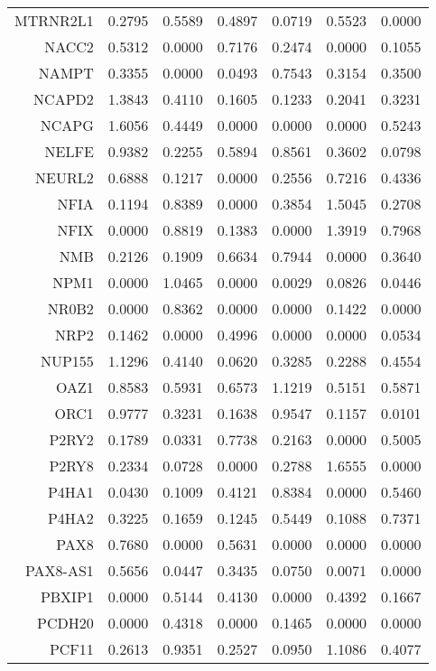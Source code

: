 \begin{longtable}{rrrrrrr}
  MTRNR2L1 & 0.2795 & 0.5589 & 0.4897 & 0.0719 & 0.5523 & 0.0000 \\ 
  NACC2 & 0.5312 & 0.0000 & 0.7176 & 0.2474 & 0.0000 & 0.1055 \\ 
  NAMPT & 0.3355 & 0.0000 & 0.0493 & 0.7543 & 0.3154 & 0.3500 \\ 
  NCAPD2 & 1.3843 & 0.4110 & 0.1605 & 0.1233 & 0.2041 & 0.3231 \\ 
  NCAPG & 1.6056 & 0.4449 & 0.0000 & 0.0000 & 0.0000 & 0.5243 \\ 
  NELFE & 0.9382 & 0.2255 & 0.5894 & 0.8561 & 0.3602 & 0.0798 \\ 
  NEURL2 & 0.6888 & 0.1217 & 0.0000 & 0.2556 & 0.7216 & 0.4336 \\ 
  NFIA & 0.1194 & 0.8389 & 0.0000 & 0.3854 & 1.5045 & 0.2708 \\ 
  NFIX & 0.0000 & 0.8819 & 0.1383 & 0.0000 & 1.3919 & 0.7968 \\ 
  NMB & 0.2126 & 0.1909 & 0.6634 & 0.7944 & 0.0000 & 0.3640 \\ 
  NPM1 & 0.0000 & 1.0465 & 0.0000 & 0.0029 & 0.0826 & 0.0446 \\ 
  NR0B2 & 0.0000 & 0.8362 & 0.0000 & 0.0000 & 0.1422 & 0.0000 \\ 
  NRP2 & 0.1462 & 0.0000 & 0.4996 & 0.0000 & 0.0000 & 0.0534 \\ 
  NUP155 & 1.1296 & 0.4140 & 0.0620 & 0.3285 & 0.2288 & 0.4554 \\ 
  OAZ1 & 0.8583 & 0.5931 & 0.6573 & 1.1219 & 0.5151 & 0.5871 \\ 
  ORC1 & 0.9777 & 0.3231 & 0.1638 & 0.9547 & 0.1157 & 0.0101 \\ 
  P2RY2 & 0.1789 & 0.0331 & 0.7738 & 0.2163 & 0.0000 & 0.5005 \\ 
  P2RY8 & 0.2334 & 0.0728 & 0.0000 & 0.2788 & 1.6555 & 0.0000 \\ 
  P4HA1 & 0.0430 & 0.1009 & 0.4121 & 0.8384 & 0.0000 & 0.5460 \\ 
  P4HA2 & 0.3225 & 0.1659 & 0.1245 & 0.5449 & 0.1088 & 0.7371 \\ 
  PAX8 & 0.7680 & 0.0000 & 0.5631 & 0.0000 & 0.0000 & 0.0000 \\ 
  PAX8-AS1 & 0.5656 & 0.0447 & 0.3435 & 0.0750 & 0.0071 & 0.0000 \\ 
  PBXIP1 & 0.0000 & 0.5144 & 0.4130 & 0.0000 & 0.4392 & 0.1667 \\ 
  PCDH20 & 0.0000 & 0.4318 & 0.0000 & 0.1465 & 0.0000 & 0.0000 \\ 
  PCF11 & 0.2613 & 0.9351 & 0.2527 & 0.0950 & 1.1086 & 0.4077 \\ 

\end{longtable}
